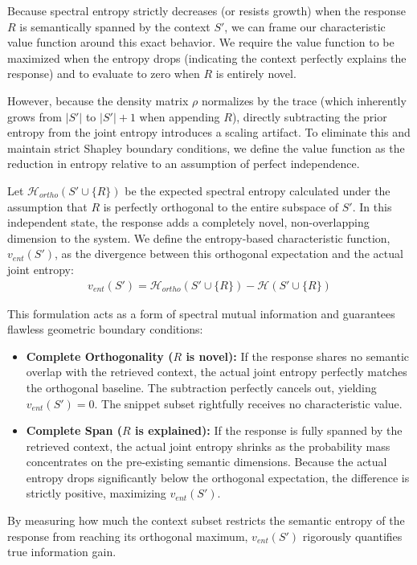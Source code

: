 \documentclass{article}
\begin{document}
Because spectral entropy strictly decreases (or resists growth) when the response $R$ is semantically spanned by the context $S'$, we can frame our characteristic value function around this exact behavior. We require the value function to be maximized when the entropy drops (indicating the context perfectly explains the response) and to evaluate to zero when $R$ is entirely novel.

However, because the density matrix $\rho$ normalizes by the trace (which inherently grows from $\vert S' \vert$ to $\vert S' \vert + 1$ when appending $R$), directly subtracting the prior entropy from the joint entropy introduces a scaling artifact. To eliminate this and maintain strict Shapley boundary conditions, we define the value function as the reduction in entropy relative to an assumption of perfect independence.

Let $\mathcal{H}_{ortho}(S' \cup \{R\})$ be the expected spectral entropy calculated under the assumption that $R$ is perfectly orthogonal to the entire subspace of $S'$. In this independent state, the response adds a completely novel, non-overlapping dimension to the system. We define the entropy-based characteristic function, $v_{ent}(S')$, as the divergence between this orthogonal expectation and the actual joint entropy:
\begin{align} \label{eq:v_ent_mi}
v_{ent}(S') = \mathcal{H}_{ortho}(S' \cup \{R\}) - \mathcal{H}(S' \cup \{R\})
\end{align}

This formulation acts as a form of spectral mutual information and guarantees flawless geometric boundary conditions:
\begin{itemize}
    \item \textbf{Complete Orthogonality ($R$ is novel):} If the response shares no semantic overlap with the retrieved context, the actual joint entropy perfectly matches the orthogonal baseline. The subtraction perfectly cancels out, yielding $v_{ent}(S') = 0$. The snippet subset rightfully receives no characteristic value.
    \item \textbf{Complete Span ($R$ is explained):} If the response is fully spanned by the retrieved context, the actual joint entropy shrinks as the probability mass concentrates on the pre-existing semantic dimensions. Because the actual entropy drops significantly below the orthogonal expectation, the difference is strictly positive, maximizing $v_{ent}(S')$.
\end{itemize}
By measuring how much the context subset restricts the semantic entropy of the response from reaching its orthogonal maximum, $v_{ent}(S')$ rigorously quantifies true information gain.
\end{document}
